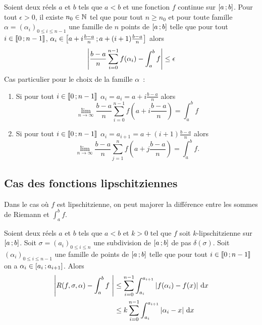 \begin{cor}
  Soient deux réels $a$ et $b$ tels que $a<b$ et une fonction $f$ continue sur $\left[ a \, ;  b \right]$. Pour tout $\epsilon >0$, il existe $n_0 \in \mathbb{N}$ tel que pour tout $n \geq n_0$ et pour toute famille  $\alpha=(\alpha_i)_{0 \leq i \leq n-1}$ une famille de $n$ points de $\left[ a \, ;  b \right]$ telle que pour tout $i \in \mathopen{\llbracket}0\mathclose{}\mathpunct{};n-1\mathclose{\rrbracket}$, $\alpha_i \in \left[ a+i \frac{b-a}{n} \, ;  a+(i+1)\frac{b-a}{n} \right]$ alors
  \begin{equation}
    \left\lvert\frac{b-a}{n} \sum_{i=0}^{n-1}f(\alpha_i) - \int_a^b f\right\rvert \leq \epsilon
  \end{equation}
  Cas particulier pour le choix de la famille $\alpha$~:
  \begin{enumerate}
  \item Si pour tout $i \in \mathopen{\llbracket}0\mathclose{}\mathpunct{};n-1\mathclose{\rrbracket}$ $\alpha_i=a_i=a+i\frac{b-a}{n}$ alors
    \begin{equation}
      \lim\limits_{n \to \infty} \frac{b-a}{n} \sum_{i=0}^{n-1}f\left(a+i\frac{b-a}{n}\right) = \int_a^b f
    \end{equation}
    \item Si pour tout $i \in \mathopen{\llbracket}0\mathclose{}\mathpunct{};n-1\mathclose{\rrbracket}$ $\alpha_i=a_{i+1}=a+(i+1)\frac{b-a}{n}$ alors
    \begin{equation}
      \lim\limits_{n \to \infty} \frac{b-a}{n} \sum_{j=1}^{n}f\left(a+j\frac{b-a}{n}\right) = \int_a^b f.
    \end{equation}
  \end{enumerate}
\end{cor}

\subsection{Cas des fonctions lipschitziennes}

Dans le cas où $f$ est lipschitzienne, on peut majorer la différence entre les sommes de Riemann et $\int_a^b f$.

Soient deux réels $a$ et $b$ tels que $a<b$ et $k>0$ tel que $f$ soit $k$-lipschitzienne sur $\left[ a \, ;  b \right]$. Soit $\sigma=(a_i)_{0 \leq i \leq n}$ une subdivision de $\left[ a \, ;  b \right]$ de pas $\delta(\sigma)$. Soit $(\alpha_i)_{0 \leq i \leq n-1}$ une famille de points de $\left[ a \, ;  b \right]$ telle que pour tout $i \in \mathopen{\llbracket}0\mathclose{}\mathpunct{};n-1\mathclose{\rrbracket}$ on a $\alpha_i \in \left[ a_i \, ;  a_{i+1} \right]$. Alors
\begin{align}
\left\lvert R(f,\sigma,\alpha)- \int_a^b f~\right\rvert &\leq \sum_{i=0}^{n-1} \int_{a_i}^{a_{i+1}} \left\lvert f(\alpha_i)-f(x)\right\rvert\,\mathop{}\mathopen{}\mathrm{d} x \\
&\leq k \sum_{i=0}^{n-1} \int_{a_i}^{a_{i+1}} \left\lvert\alpha_i-x\right\rvert\,\mathop{}\mathopen{}\mathrm{d} x
\end{align}

